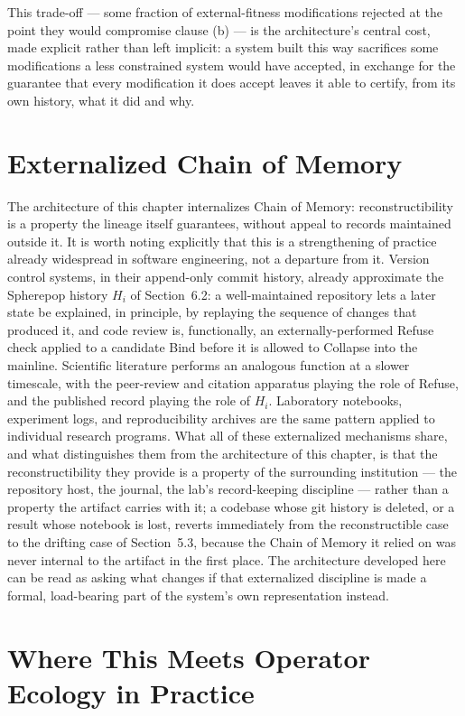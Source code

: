 \documentclass[11pt]{book}
\begin{document}
This trade-off --- some fraction of external-fitness modifications rejected at the point they would compromise clause (b) --- is the architecture's central cost, made explicit rather than left implicit: a system built this way sacrifices some modifications a less constrained system would have accepted, in exchange for the guarantee that every modification it does accept leaves it able to certify, from its own history, what it did and why.

\section{Externalized Chain of Memory}

The architecture of this chapter internalizes Chain of Memory: reconstructibility is a property the lineage itself guarantees, without appeal to records maintained outside it. It is worth noting explicitly that this is a strengthening of practice already widespread in software engineering, not a departure from it. Version control systems, in their append-only commit history, already approximate the Spherepop history $H_i$ of Section~6.2: a well-maintained repository lets a later state be explained, in principle, by replaying the sequence of changes that produced it, and code review is, functionally, an externally-performed Refuse check applied to a candidate Bind before it is allowed to Collapse into the mainline. Scientific literature performs an analogous function at a slower timescale, with the peer-review and citation apparatus playing the role of Refuse, and the published record playing the role of $H_i$. Laboratory notebooks, experiment logs, and reproducibility archives are the same pattern applied to individual research programs. What all of these externalized mechanisms share, and what distinguishes them from the architecture of this chapter, is that the reconstructibility they provide is a property of the surrounding institution --- the repository host, the journal, the lab's record-keeping discipline --- rather than a property the artifact carries with it; a codebase whose git history is deleted, or a result whose notebook is lost, reverts immediately from the reconstructible case to the drifting case of Section~5.3, because the Chain of Memory it relied on was never internal to the artifact in the first place. The architecture developed here can be read as asking what changes if that externalized discipline is made a formal, load-bearing part of the system's own representation instead.

\section{Where This Meets Operator Ecology in Practice}
\end{document}
